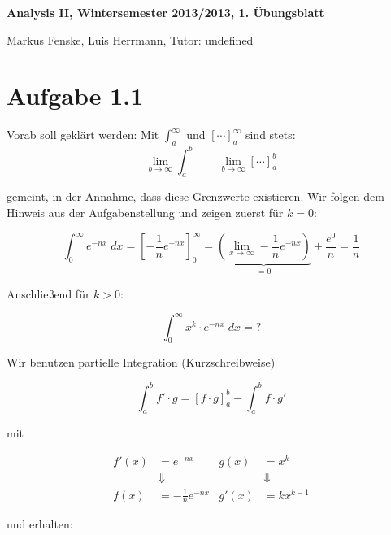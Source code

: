 \documentclass[a4paper,german,12pt,smallheadings]{scrartcl}
\begin{document}
\begin{center}
\bfseries %
\sffamily %
\vspace{-40pt}
Analysis II, Wintersemester 2013/2013, 1. Übungsblatt

Markus Fenske, Luis Herrmann, Tutor: undefined
\vspace{-10pt}
\end{center}

\section*{Aufgabe 1.1}

Vorab soll geklärt werden: Mit $\int_{a}^{\infty}$ und $\left[\cdots\right]_a^\infty$ sind stets:
\begin{equation*}
\lim\limits_{b \to \infty}\int_{a}^{b} \quad \quad \lim\limits_{b \to \infty}\left[\cdots\right]_a^b
\end{equation*}

gemeint, in der Annahme, dass diese Grenzwerte existieren.
Wir folgen dem Hinweis aus der Aufgabenstellung und zeigen zuerst für $k=0$:

\begin{equation*}
  \int_0^\infty e^{-nx} \; dx = \left[ -\frac{1}{n} e^{-nx} \right]_0^\infty = \underbrace{\left(\lim_{x \to \infty} - \frac{1}{n} e^{-nx} \right)}_{=0} + \frac{e^0}{n} = \frac{1}{n}
\end{equation*}

Anschließend für $k > 0$:

\begin{equation*}
  \int_0^\infty x^k \cdot e^{-nx} \; dx = \text{?}
\end{equation*}

Wir benutzen partielle Integration (Kurzschreibweise)

\begin{equation*}
  \int_a^b f' \cdot g = \left[f \cdot g\right]_a^b - \int_a^b f \cdot g'
\end{equation*}

mit

\begin{align*}
  f'(x) &= e^{-nx} & g(x) &= x^k \\
        &\Downarrow & &\Downarrow\\
  f(x) &= -\frac{1}{n} e^{-nx} & g'(x) &= kx^{k-1}
\end{align*}

und erhalten:
\end{document}
